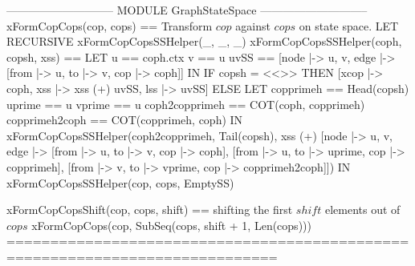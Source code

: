 \documentclass{article}
\begin{document}
\begin{tla}
----------------------------- MODULE GraphStateSpace -----------------------------
xFormCopCops(cop, cops) == \* Transform $cop$ against $cops$ on state space.
    LET RECURSIVE xFormCopCopsSSHelper(_, _, _) 
        xFormCopCopsSSHelper(coph, copsh, xss) == 
            LET u == coph.ctx
                v == u 
             uvSS == [node |-> {u, v}, 
                      edge |-> {[from |-> u, to |-> v, cop |-> coph]}]
             IN IF copsh = <<>> THEN [xcop |-> coph, 
                                       xss |-> xss (+) uvSS, lss |-> uvSS]
                ELSE LET copprimeh == Head(copsh)
                            uprime == u 
                            vprime == u 
                         coph2copprimeh == COT(coph, copprimeh)
                         copprimeh2coph == COT(copprimeh, coph)
                      IN xFormCopCopsSSHelper(coph2copprimeh, 
                            Tail(copsh),
                            xss (+) [node |-> {u, v}, 
                                     edge |-> {[from |-> u, to |-> v, cop |-> coph],
                                               [from |-> u, to |-> uprime, 
                                                 cop |-> copprimeh],
                                               [from |-> v, to |-> vprime, 
                                                 cop |-> copprimeh2coph]}])
    IN  xFormCopCopsSSHelper(cop, cops, EmptySS)

xFormCopCopsShift(cop, cops, shift) == 
                    \* shifting the first $shift$ elements out of $cops$
    xFormCopCops(cop, SubSeq(cops, shift + 1, Len(cops)))
=============================================================================
\end{tla}
\end{document}
